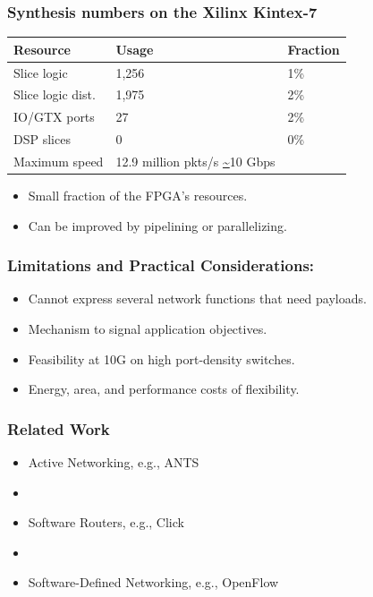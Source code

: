 \begin{Large}
\begin{frame}[plain]
\frametitle{Synthesis numbers on the Xilinx Kintex-7}
\begin{center}
\begin{tabular}{p{} p{} p{}}
\bf Resource & \bf Usage & \bf Fraction \\
\hline Slice logic & 1,256 & 1\% \\
Slice logic dist. & 1,975 & 2\% \\
IO/GTX ports & 27 & 2\% \\
DSP slices & 0 & 0\% \\
Maximum speed & 12.9 million pkts/s \url{~}10 Gbps \\
\end{tabular}
\end{center}
\begin{itemize}
\item Small fraction of the FPGA's resources.
\item Can be improved by pipelining or parallelizing.
\end{itemize}
\end{frame}

\begin{frame}[plain]
\frametitle{Limitations and Practical Considerations:}
\begin{itemize}
\item Cannot express several network functions that need payloads.
\item Mechanism to signal application objectives.
\item Feasibility at 10G on high port-density  switches.
\item Energy, area, and performance costs of flexibility.
\end{itemize}
\end{frame}

\begin{frame}[plain]
\frametitle{Related Work}
\begin{itemize}
\item Active Networking, e.g., ANTS
\item []
\item Software Routers, e.g., Click
\item []
\item Software-Defined Networking, e.g., OpenFlow
\end{itemize}
\end{frame}

\begin{frame}[plain]


\end{frame}
\end{Large}
